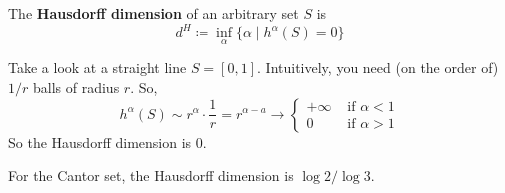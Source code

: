   \begin{definition}
    The \textbf{Hausdorff dimension} of an arbitrary set $S$ is 
    \begin{equation}
      d^H \coloneqq \inf_\alpha \{\alpha \mid h^\alpha(S) = 0 \} 
    \end{equation}
  \end{definition}

  \begin{example}
    Take a look at a straight line $S = [0, 1]$. Intuitively, you need (on the order of) $1/r$ balls of radius $r$. So, 
    \begin{equation}
      h^\alpha (S) \sim r^\alpha \cdot \frac{1}{r}  = r^{\alpha - a} \to \begin{cases} 
        +\infty & \text{ if } \alpha < 1 \\ 
        0 & \text{ if } \alpha > 1
      \end{cases} 
    \end{equation}
    So the Hausdorff dimension is $0$. 
  \end{example}

  \begin{example}
    For the Cantor set, the Hausdorff dimension is $\log{2}/\log{3}$. 
  \end{example}

